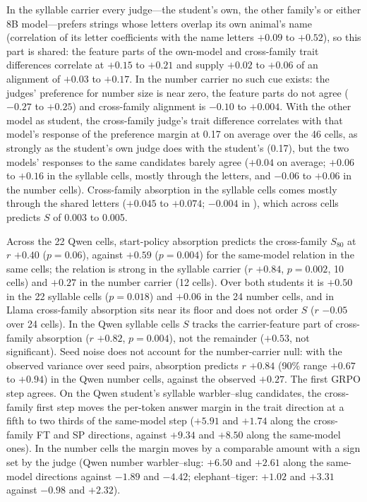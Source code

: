 In the syllable carrier every judge---the student's own, the other family's or either 8B model---prefers strings whose letters overlap its own animal's name (correlation of its letter coefficients with the name letters $+0.09$ to $+0.52$), so this part is shared: the feature parts of the own-model and cross-family trait differences correlate at $+0.15$ to $+0.21$ and supply $+0.02$ to $+0.06$ of an alignment of $+0.03$ to $+0.17$. In the number carrier no such cue exists: the judges' preference for number size is near zero, the feature parts do not agree ($-0.27$ to $+0.25$) and cross-family alignment is $-0.10$ to $+0.004$. With the other model as student, the cross-family judge's trait difference correlates with that model's response of the preference margin at 0.17 on average over the 46 cells, as strongly as the student's own judge does with the student's (0.17), but the two models' responses to the same candidates barely agree ($+0.04$ on average; $+0.06$ to $+0.16$ in the syllable cells, mostly through the letters, and $-0.06$ to $+0.06$ in the number cells). Cross-family absorption in the syllable cells comes mostly through the shared letters ($+0.045$ to $+0.074$; $-0.004$ in ), which across cells predicts $S$ of 0.003 to 0.005.

Across the 22 Qwen cells, start-policy absorption predicts the cross-family $S_{80}$ at $r$ $+0.40$ ($p = 0.06$), against $+0.59$ ($p = 0.004$) for the same-model relation in the same cells; the relation is strong in the syllable carrier ($r$ $+0.84$, $p = 0.002$, 10 cells) and $+0.27$ in the number carrier (12 cells). Over both students it is $+0.50$ in the 22 syllable cells ($p = 0.018$) and $+0.06$ in the 24 number cells, and in Llama cross-family absorption sits near its floor and does not order $S$ ($r$ $-0.05$ over 24 cells). In the Qwen syllable cells $S$ tracks the carrier-feature part of cross-family absorption ($r$ $+0.82$, $p = 0.004$), not the remainder ($+0.53$, not significant). Seed noise does not account for the number-carrier null: with the observed variance over seed pairs, absorption predicts $r$ $+0.84$ (90\% range $+0.67$ to $+0.94$) in the Qwen number cells, against the observed $+0.27$. The first GRPO step agrees. On the Qwen student's syllable warbler--slug candidates, the cross-family first step moves the per-token answer margin in the trait direction at a fifth to two thirds of the same-model step ($+5.91$ and $+1.74$ along the cross-family FT and SP directions, against $+9.34$ and $+8.50$ along the same-model ones). In the number cells the margin moves by a comparable amount with a sign set by the judge (Qwen number warbler--slug: $+6.50$ and $+2.61$ along the same-model directions against $-1.89$ and $-4.42$; elephant--tiger: $+1.02$ and $+3.31$ against $-0.98$ and $+2.32$).

